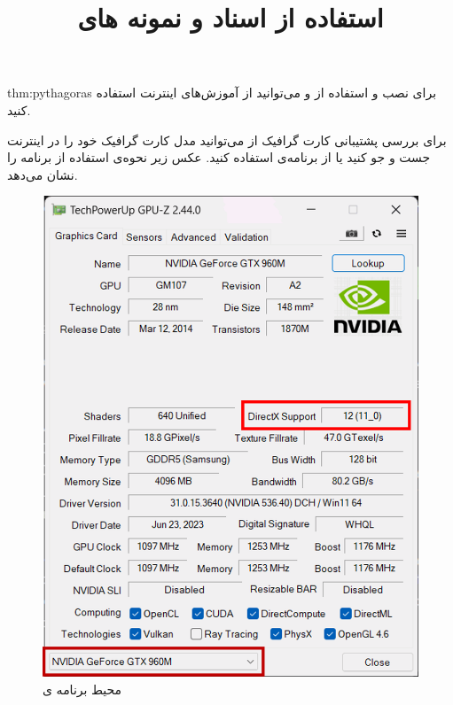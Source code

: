 \begin{theo}{thm:pythagoras}
    \Large
    برای نصب و استفاده از  و  می‌توانید از آموزش‌های اینترنت استفاده کنید.

    برای بررسی پشتیبانی کارت گرافیک از  می‌توانید مدل کارت گرافیک خود را در اینترنت جست و جو کنید یا از برنامه‌ی  استفاده کنید. عکس زیر نحوه‌ی استفاده از برنامه را نشان می‌دهد.

    \begin{figure}[H]
        \centering
        \setlength{\belowcaptionskip}{-10pt}
        \includegraphics[scale=0.50]{Images/3.Intro.0.1.png}
        \caption*{\Large محیط برنامه ی  \textbf{\vspace{12pt}}}
    \end{figure}
\end{theo}
\textbf{\vspace{25pt}}

\title{
    \LARGE
    \textbf{استفاده از اسناد  و نمونه های }
} \rullFillWithLine[0.5em]{1pt}
\textbf{\vspace{12pt}}


